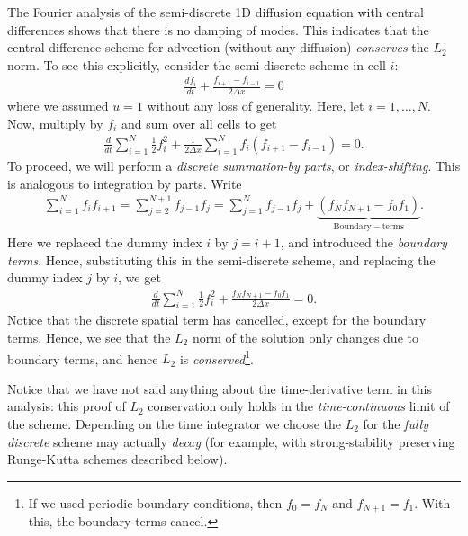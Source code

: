 \documentclass[12pt]{article}
\theoremstyle{definition}
\theoremstyle{definition}
\theoremstyle{definition}
\begin{document}
The Fourier analysis of the semi-discrete 1D diffusion equation with
central differences shows that there is no damping of modes. This
indicates that the central difference scheme for advection (without
any diffusion) \emph{conserves} the $L_2$ norm. To see this
explicitly, consider the semi-discrete scheme in cell $i$:
\begin{align}
  \frac{d f_i}{dt}
  +
  \frac{f_{i+1} - f_{i-1}}{2 \Delta x}
  = 0
\end{align}
where we assumed $u=1$ without any loss of generality. Here, let
$i=1,\ldots, N$. Now, multiply by $f_i$ and sum over all cells to get
\begin{align}
  \frac{d}{dt}  \sum_{i=1}^N \frac{1}{2} f_i^2
  +
  \frac{1}{2\Delta x}\sum_{i=1}^N f_i (f_{i+1} - f_{i-1})
  = 0.
\end{align}
To proceed, we will perform a \emph{discrete summation-by parts}, or
\emph{index-shifting}. This is analogous to integration by
parts. Write
\begin{align}
  \sum_{i=1}^N f_i f_{i+1}
  =
  \sum_{j=2}^{N+1} f_{j-1} f_j
  =
  \sum_{j=1}^{N} f_{j-1} f_j
  +
  \underbrace{
  (f_N f_{N+1} - f_0 f_1)
  }_{
  \mathrm{Boundary-terms}
  }.
\end{align}
Here we replaced the dummy index $i$ by $j = i+1$, and introduced the
\emph{boundary terms}. Hence, substituting this in the semi-discrete
scheme, and replacing the dummy index $j$ by $i$, we get
\begin{align}
  \frac{d}{dt}  \sum_{i=1}^N \frac{1}{2} f_i^2
  +
  \frac{f_N f_{N+1} - f_0 f_1}{2\Delta x}
  = 0.
\end{align}
Notice that the discrete spatial term has cancelled, except for the
boundary terms. Hence, we see that the $L_2$ norm of the solution only
changes due to boundary terms, and hence $L_2$ is
\emph{conserved}\footnote{If we used periodic boundary conditions,
  then $f_0 = f_N$ and $f_{N+1} = f_1$. With this, the boundary terms
  cancel.}.

Notice that we have not said anything about the time-derivative term
in this analysis: this proof of $L_2$ conservation only holds in the
\emph{time-continuous} limit of the scheme. Depending on the time
integrator we choose the $L_2$ for the \emph{fully discrete} scheme
may actually \emph{decay} (for example, with strong-stability
preserving Runge-Kutta schemes described below).
\end{document}
